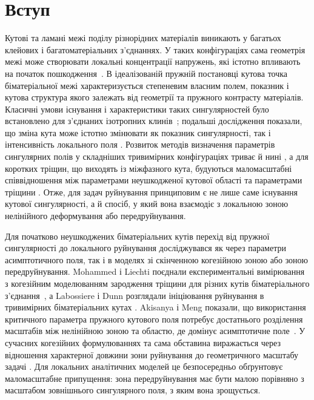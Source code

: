 \section{Вступ}
\label{sec:introduction}

Кутові та ламані межі поділу різнорідних матеріалів виникають у багатьох
клейових і багатоматеріальних з'єднаннях. У таких конфігураціях сама
геометрія межі може створювати локальні концентрації напружень, які
істотно впливають на початок пошкодження~\cite{GacoinEtAl2009}. В
ідеалізованій пружній постановці кутова точка біматеріальної межі
характеризується степеневим власним полем, показник і кутова структура
якого залежать від геометрії та пружного контрасту матеріалів. Класичні
умови існування і характеристики таких сингулярностей було встановлено
для з'єднаних ізотропних клинів~\cite{BogyWang1971,DempseySinclair1981};
подальші дослідження показали, що зміна кута може істотно змінювати як
показник сингулярності, так і інтенсивність локального поля
\cite{MohammedLiechti2001}. Розвиток методів визначення параметрів
сингулярних полів у складніших тривимірних конфігураціях триває й нині
\cite{MiyazakiFukudaNoda2025}, а для коротких тріщин, що виходять із
міжфазного кута, будуються маломасштабні співвідношення між параметрами
неушкодженої кутової області та параметрами тріщини
\cite{LyuZhangMai2026}. Отже, для задач руйнування принциповим є не лише
саме існування кутової сингулярності, а й спосіб, у який вона взаємодіє з
локальною зоною нелінійного деформування або передруйнування.

Для початково неушкоджених біматеріальних кутів перехід від пружної
сингулярності до локального руйнування досліджувався як через параметри
асимптотичного поля, так і в моделях зі скінченною когезійною зоною або
зоною передруйнування. Mohammed і Liechti поєднали експериментальні
вимірювання з когезійним моделюванням зародження тріщини для різних кутів
біматеріального з'єднання~\cite{MohammedLiechti2000}, а Labossiere і Dunn
розглядали ініціювання руйнування в тривимірних біматеріальних кутах
\cite{LabossiereDunn2001}. Akisanya і Meng показали, що використання
критичного параметра пружного кутового поля потребує достатнього
розділення масштабів між нелінійною зоною та областю, де домінує
асимптотичне поле~\cite{AkisanyaMeng2003}. У сучасних когезійних
формулюваннях та сама обставина виражається через відношення характерної
довжини зони руйнування до геометричного масштабу задачі
\cite{GormanThouless2022,ThoulessGoutianos2023}. Для локальних
аналітичних моделей це безпосередньо обґрунтовує маломасштабне
припущення: зона передруйнування має бути малою порівняно з масштабом
зовнішнього сингулярного поля, з яким вона зрощується.

